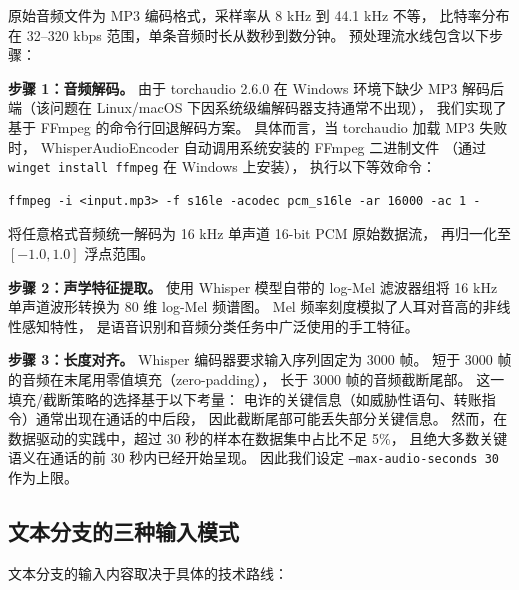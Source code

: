 \documentclass[11pt,a4paper]{ctexart}
\begin{document}
原始音频文件为 MP3 编码格式，采样率从 8 kHz 到 44.1 kHz 不等，
比特率分布在 32--320 kbps 范围，单条音频时长从数秒到数分钟。
预处理流水线包含以下步骤：

\textbf{步骤 1：音频解码。}
由于 torchaudio 2.6.0 在 Windows 环境下缺少 MP3 解码后端（该问题在 Linux/macOS 下因系统级编解码器支持通常不出现），
我们实现了基于 FFmpeg 的命令行回退解码方案。
具体而言，当 torchaudio 加载 MP3 失败时，
WhisperAudioEncoder 自动调用系统安装的 FFmpeg 二进制文件
（通过 \texttt{winget install ffmpeg} 在 Windows 上安装），
执行以下等效命令：
\begin{verbatim}
ffmpeg -i <input.mp3> -f s16le -acodec pcm_s16le -ar 16000 -ac 1 -
\end{verbatim}
将任意格式音频统一解码为 16 kHz 单声道 16-bit PCM 原始数据流，
再归一化至 $[-1.0, 1.0]$ 浮点范围。

\textbf{步骤 2：声学特征提取。}
使用 Whisper 模型自带的 log-Mel 滤波器组将 16 kHz 单声道波形转换为 80 维 log-Mel 频谱图。
Mel 频率刻度模拟了人耳对音高的非线性感知特性，
是语音识别和音频分类任务中广泛使用的手工特征。

\textbf{步骤 3：长度对齐。}
Whisper 编码器要求输入序列固定为 3000 帧。
短于 3000 帧的音频在末尾用零值填充（zero-padding），
长于 3000 帧的音频截断尾部。
这一填充/截断策略的选择基于以下考量：
电诈的关键信息（如威胁性语句、转账指令）通常出现在通话的中后段，
因此截断尾部可能丢失部分关键信息。
然而，在数据驱动的实践中，超过 30 秒的样本在数据集中占比不足 5\%，
且绝大多数关键语义在通话的前 30 秒内已经开始呈现。
因此我们设定 \texttt{--max-audio-seconds 30} 作为上限。

\subsection{文本分支的三种输入模式}

文本分支的输入内容取决于具体的技术路线：
\end{document}
